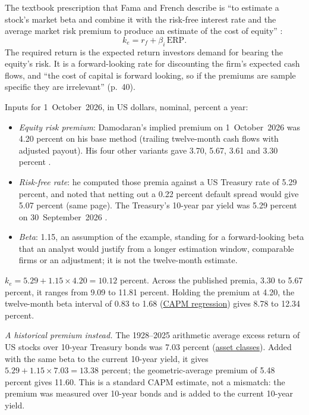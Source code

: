 \begin{qfmethod}\label{meth:required-return-on-equity}
 The textbook prescription that Fama and French describe is ``to estimate a stock's market beta and combine it with the risk-free interest rate and the average market risk premium to produce an estimate of the cost of equity'' \citep[\emph{JEP} 18(3), 2004, p.~43]{capm-theory-evidence-2004}:
\[ k_e=r_f+\beta_i\,\mathrm{ERP}. \]
The required return is the expected return investors demand for bearing the equity's risk. It is a forward-looking rate for discounting the firm's expected cash flows, and ``the cost of capital is forward looking, so if the premiums are sample specific they are irrelevant'' (p.~40).

 Inputs for 1~October~2026, in US dollars, nominal, percent a year:
\begin{itemize}
\item \emph{Equity risk premium}: Damodaran's implied premium on 1~October~2026 was 4.20 percent on his base method (trailing twelve-month cash flows with adjusted payout). His four other variants gave 3.70, 5.67, 3.61 and 3.30 percent \citep[home page, ``Equity Risk Premiums'', read 2026-10-18]{implied-equity-premium-2026}.
\item \emph{Risk-free rate}: he computed those premia against a US Treasury rate of 5.29 percent, and noted that netting out a 0.22 percent default spread would give 5.07 percent (same page). The Treasury's 10-year par yield was 5.29 percent on 30~September~2026 \citep[2026 file, retrieved 2026-10-18]{ust-par-yield-curve}.
\item \emph{Beta}: 1.15, an assumption of the example, standing for a forward-looking beta that an analyst would justify from a longer estimation window, comparable firms or an adjustment; it is not the twelve-month estimate.
\end{itemize}

 $k_e=5.29+1.15\times4.20=10.12$ percent. Across the published premia, 3.30 to 5.67 percent, it ranges from 9.09 to 11.81 percent. Holding the premium at 4.20, the twelve-month beta interval of 0.83 to 1.68 (\hyperref[meth:capm-regression]{CAPM regression}) gives 8.78 to 12.34 percent.

\emph{A historical premium instead.} The 1928--2025 arithmetic average excess return of US stocks over 10-year Treasury bonds was 7.03 percent (\hyperref[def:asset-class-characteristics]{asset classes}). Added with the same beta to the current 10-year yield, it gives $5.29+1.15\times7.03=13.38$ percent; the geometric-average premium of 5.48 percent gives 11.60. This is a standard CAPM estimate, not a mismatch: the premium was measured over 10-year bonds and is added to the current 10-year yield.


\end{qfmethod}
